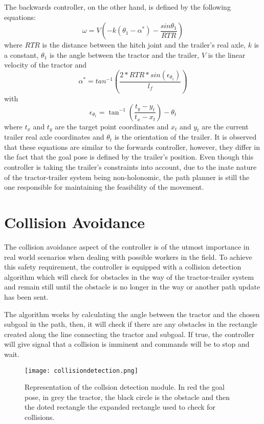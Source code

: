 The backwards controller, on the other hand, is defined by the following equations:
\begin{equation}
    \omega = V \left(-k (\theta_1 - \alpha^*) - \frac{sin\theta_1}{RTR}\right)
\end{equation}
where $RTR$ is the distance between the hitch joint and the trailer's real axle, 
$k$ is a constant, $\theta_1$ is the angle between the tractor and the trailer, 
$V$ is the linear velocity of the tractor and 
\begin{equation}
    \alpha^* = tan^{-1}\left(\frac{2*RTR*sin(\epsilon_{\theta_1})}{l_f}\right)
\end{equation}
with
\begin{equation}
    \epsilon_{\theta_1} = \tan^{-1}\left(\frac{t_y - y_t}{t_x - x_t}\right) - \theta_t
\end{equation}
where $t_x$ and $t_y$ are the target point coordinates and $x_t$ and $y_t$ are the current trailer real axle coordinates and 
$\theta_t$ is the orientation of the trailer. It is observed that 
these equations are similar to the forwards controller, however, they differ 
in the fact that the goal pose is defined by the trailer's position. Even though 
this controller is taking the trailer's constraints into account, due to 
the inate nature of the tractor-trailer system being non-holonomic, the 
path planner is still the one responsible for maintaining the feasibility 
of the movement.


\section{Collision Avoidance}
\label{sec:collision}
The collision avoidance aspect of the controller is of the utmost importance 
in real world scenarios when dealing with possible workers in the field. To achieve 
this safety requirement, the controller is equipped with a collision detection algorithm 
which will check for obstacles in the way of the tractor-trailer system and remain still until the 
obstacle is no longer in the way or another path update has been sent.

The algorithm works by calculating the angle between the tractor and the chosen 
subgoal in the path, then, it will check if there are any obstacles in the rectangle 
created along the line connecting the tractor and subgoal. If true, the controller will 
give signal that a collision is imminent and commands will be to stop and wait.

\begin{figure}[h]
    \centering
    \texttt{[image: collisiondetection.png]}
    \caption{Representation of the collsion detection module. In red the goal pose, in grey the tractor, the black circle is the obstacle and then the doted rectangle the expanded rectangle used to check for collisions.}
    \label{fig:collisiondetection}
\end{figure}


